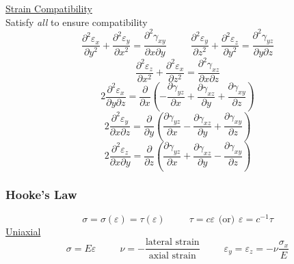 \documentclass[twocolumn, 12pt]{article}    %
\begin{document}
\underline{Strain Compatibility}\\
Satisfy \emph{all} to ensure compatibility
\begin{equation*}
     \frac{\partial^2{\varepsilon_x}}{\partial{y^2}} +  \frac{\partial^2{
     \varepsilon_y}}{\partial{x^2}} =  \frac{\partial^2{\gamma_{xy}
     }}{\partial x\partial y}      \hspace{30pt}  \frac{\partial^2{\varepsilon_y}}{\partial{z^2}} +  \frac{\partial^2{
     \varepsilon_z}}{\partial{y^2}} =  \frac{\partial^2{\gamma_{yz}
     }}{\partial y\partial z}     
\end{equation*}
\begin{equation*}
    \frac{\partial^2{\varepsilon_z}}{\partial{x^2}} +  \frac{\partial^2{
     \varepsilon_x}}{\partial{z^2}} =  \frac{\partial^2{\gamma_{xz}
     }}{\partial x\partial z} 
\end{equation*}
\begin{equation*}
    2 \frac{\partial^2{\varepsilon_x}}{\partial y \partial z} =  \frac{\partial{}}{\partial{x}} \left( - \frac{\partial{\gamma_{yz}}}{\partial{x}} +  \frac{\partial{\gamma_{xz}}}{\partial{y}}  +  \frac{\partial{
     \gamma_{xy}}}{\partial{z}} \right)
\end{equation*}
\begin{equation*}
    2 \frac{\partial^2{\varepsilon_y}}{\partial x \partial z} =  \frac{\partial{}}{\partial{y}} \left( \frac{\partial{\gamma_{yz}}}{\partial{x}} -  \frac{\partial{\gamma_{xz}}}{\partial{y}}  +  \frac{\partial{
     \gamma_{xy}}}{\partial{z}} \right)
\end{equation*}
\begin{equation*}
    2 \frac{\partial^2{\varepsilon_z}}{\partial x \partial y} =  \frac{\partial{}}{\partial{z}} \left( \frac{\partial{\gamma_{yz}}}{\partial{x}} +  \frac{\partial{\gamma_{xz}}}{\partial{y}}  -  \frac{\partial{
     \gamma_{xy}}}{\partial{z}} \right)
\end{equation*}


\subsubsection*{Hooke's Law}
\begin{equation*}
    \sigma = \sigma(\varepsilon)=\tau(\varepsilon) \hspace{30pt}  \tau =c\varepsilon \hspace{5pt} \text{(or)} \hspace{5pt} \varepsilon=c^{-1}\tau
\end{equation*}
\underline{Uniaxial}\\
\begin{equation*}
     \sigma = E\varepsilon \hspace{30pt }\nu=-\frac{\text{lateral strain}}{\text{axial strain}} \hspace{30pt} \varepsilon_y=\varepsilon_z = -\nu \frac{\sigma_x}{E}
\end{equation*}
\end{document}
